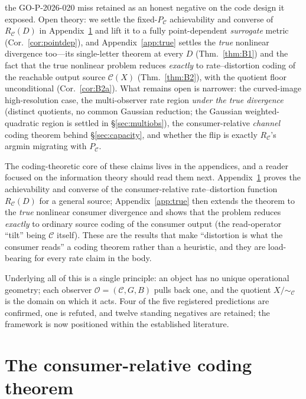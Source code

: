 \documentclass[lettersize,onecolumn]{IEEEtran}
\theoremstyle{definition}
\theoremstyle{remark}
\newcommand{\PC}{P_{\mathcal{C}}}
\begin{document}
the GO-P-2026-020 miss retained as an honest negative on the code design it exposed. Open
theory: we settle the fixed-$\PC$ achievability and converse of $R_{\mathcal{C}}(D)$
in Appendix~\ref{app:coding} and lift it to a fully point-dependent \emph{surrogate}
metric (Cor.~\ref{cor:pointdep}), and Appendix~\ref{app:true} settles the \emph{true}
nonlinear divergence too---its single-letter theorem at every $D$ (Thm.~\ref{thm:B1})
and the fact that the true nonlinear problem reduces \emph{exactly} to rate--distortion
coding of the reachable output source $\mathcal{C}(X)$ (Thm.~\ref{thm:B2}), with the
quotient floor unconditional (Cor.~\ref{cor:B2a}). What
remains open is narrower: the curved-image high-resolution case, the multi-observer
rate region \emph{under the true divergence} (distinct quotients, no common Gaussian
reduction; the Gaussian weighted-quadratic region is settled in \S\ref{sec:multiobs}), the
consumer-relative
\emph{channel} coding theorem behind \S\ref{sec:capacity}, and whether the flip is
exactly $R_{\mathcal{C}}$'s argmin migrating with $\PC$.

The coding-theoretic core of these claims lives in the appendices, and a reader
focused on the information theory should read them next.
Appendix~\ref{app:coding} proves the achievability and converse of the
consumer-relative rate--distortion function $R_{\mathcal{C}}(D)$ for a general source;
Appendix~\ref{app:true} then extends the theorem to the \emph{true} nonlinear consumer
divergence and shows that the problem reduces \emph{exactly} to ordinary source coding
of the consumer output (the read-operator ``tilt'' being $\mathcal{C}$ itself). These
are the results that make ``distortion is what the consumer reads'' a coding theorem
rather than a heuristic, and they are load-bearing for every rate claim in the body.

Underlying all of
this is a single principle: an object has no unique operational geometry; each
observer $\mathcal{O}=(\mathcal{C},G,B)$ pulls back one, and the quotient
$X/\!\sim_{\mathcal{C}}$ is the domain on which it acts. Four of the five registered
predictions are confirmed, one is refuted, and twelve standing negatives are retained;
the framework is now positioned within the established literature.

\appendices
\section{The consumer-relative coding theorem}\label{app:coding}
\end{document}

